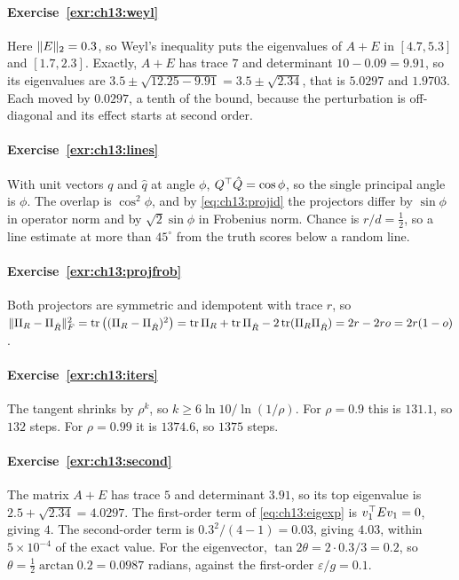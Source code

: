
\paragraph{Exercise~\ref{exr:ch13:weyl}}
Here $\lVert E\rVert_2=0.3$, so Weyl's inequality puts the eigenvalues of $A+E$ in
$[4.7,5.3]$ and $[1.7,2.3]$. Exactly, $A+E$ has trace $7$ and determinant
$10-0.09=9.91$, so its eigenvalues are $3.5\pm\sqrt{12.25-9.91}=3.5\pm\sqrt{2.34}$,
that is $5.0297$ and $1.9703$. Each moved by $0.0297$, a tenth of the bound,
because the perturbation is off-diagonal and its effect starts at second order.

\paragraph{Exercise~\ref{exr:ch13:lines}}
With unit vectors $q$ and $\hat q$ at angle $\phi$, $Q^{\top}\hat Q=\cos\phi$, so the
single principal angle is $\phi$. The overlap is $\cos^2\phi$, and by
\cref{eq:ch13:projid} the projectors differ by $\sin\phi$ in operator norm and by
$\sqrt2\sin\phi$ in Frobenius norm. Chance is $r/d=\tfrac12$, so a line estimate at
more than $45^\circ$ from the truth scores below a random line.

\paragraph{Exercise~\ref{exr:ch13:projfrob}}
Both projectors are symmetric and idempotent with trace $r$, so
$\lVert \Pi_R-\Pi_{\hat R}\rVert_F^2=\operatorname{tr}\big((\Pi_R-\Pi_{\hat R})^2\big)
=\operatorname{tr}\Pi_R+\operatorname{tr}\Pi_{\hat R}-2\operatorname{tr}(\Pi_R\Pi_{\hat R})=2r-2ro=2r(1-o)$.

\paragraph{Exercise~\ref{exr:ch13:iters}}
The tangent shrinks by $\rho^k$, so $k\ge6\ln10/\ln(1/\rho)$. For $\rho=0.9$ this is
$131.1$, so $132$ steps. For $\rho=0.99$ it is $1374.6$, so $1375$ steps.

\paragraph{Exercise~\ref{exr:ch13:second}}
The matrix $A+E$ has trace $5$ and determinant $3.91$, so its top eigenvalue is
$2.5+\sqrt{2.34}=4.0297$. The first-order term of \cref{eq:ch13:eigexp} is
$v_1^{\top} Ev_1=0$, giving $4$. The second-order term is $0.3^2/(4-1)=0.03$, giving
$4.03$, within $5\times10^{-4}$ of the exact value. For the eigenvector,
$\tan2\theta=2\cdot0.3/3=0.2$, so $\theta=\tfrac12\arctan0.2=0.0987$ radians,
against the first-order $\varepsilon/g=0.1$.

